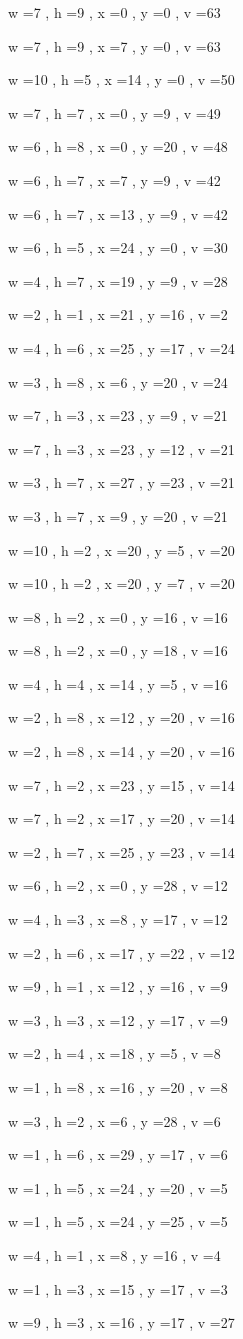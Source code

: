 \documentclass[11pt]{article}
\begin{document}
w =7 , h =9 , x =0 , y =0 , v =63
\par
w =7 , h =9 , x =7 , y =0 , v =63
\par
w =10 , h =5 , x =14 , y =0 , v =50
\par
w =7 , h =7 , x =0 , y =9 , v =49
\par
w =6 , h =8 , x =0 , y =20 , v =48
\par
w =6 , h =7 , x =7 , y =9 , v =42
\par
w =6 , h =7 , x =13 , y =9 , v =42
\par
w =6 , h =5 , x =24 , y =0 , v =30
\par
w =4 , h =7 , x =19 , y =9 , v =28
\par
w =2 , h =1 , x =21 , y =16 , v =2
\par
w =4 , h =6 , x =25 , y =17 , v =24
\par
w =3 , h =8 , x =6 , y =20 , v =24
\par
w =7 , h =3 , x =23 , y =9 , v =21
\par
w =7 , h =3 , x =23 , y =12 , v =21
\par
w =3 , h =7 , x =27 , y =23 , v =21
\par
w =3 , h =7 , x =9 , y =20 , v =21
\par
w =10 , h =2 , x =20 , y =5 , v =20
\par
w =10 , h =2 , x =20 , y =7 , v =20
\par
w =8 , h =2 , x =0 , y =16 , v =16
\par
w =8 , h =2 , x =0 , y =18 , v =16
\par
w =4 , h =4 , x =14 , y =5 , v =16
\par
w =2 , h =8 , x =12 , y =20 , v =16
\par
w =2 , h =8 , x =14 , y =20 , v =16
\par
w =7 , h =2 , x =23 , y =15 , v =14
\par
w =7 , h =2 , x =17 , y =20 , v =14
\par
w =2 , h =7 , x =25 , y =23 , v =14
\par
w =6 , h =2 , x =0 , y =28 , v =12
\par
w =4 , h =3 , x =8 , y =17 , v =12
\par
w =2 , h =6 , x =17 , y =22 , v =12
\par
w =9 , h =1 , x =12 , y =16 , v =9
\par
w =3 , h =3 , x =12 , y =17 , v =9
\par
w =2 , h =4 , x =18 , y =5 , v =8
\par
w =1 , h =8 , x =16 , y =20 , v =8
\par
w =3 , h =2 , x =6 , y =28 , v =6
\par
w =1 , h =6 , x =29 , y =17 , v =6
\par
w =1 , h =5 , x =24 , y =20 , v =5
\par
w =1 , h =5 , x =24 , y =25 , v =5
\par
w =4 , h =1 , x =8 , y =16 , v =4
\par
w =1 , h =3 , x =15 , y =17 , v =3
\par
w =9 , h =3 , x =16 , y =17 , v =27
\par
\newpage
\end{document}
